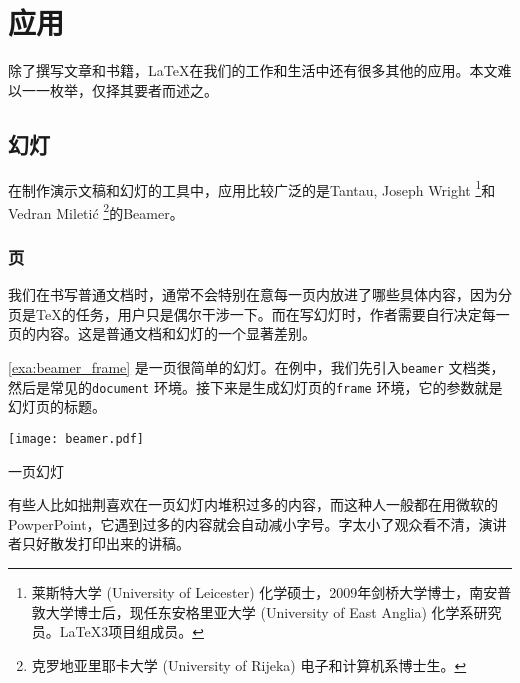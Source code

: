 \chapter{应用}

除了撰写文章和书籍，\LaTeX 在我们的工作和生活中还有很多其他的应用。本文难以一一枚举，仅择其要者而述之。

\section{幻灯}

在制作演示文稿和幻灯的工具中，应用比较广泛的是Tantau\indexTantau, Joseph Wright\indexWright{} \footnote{莱斯特大学 (University of Leicester) 化学硕士，2009年剑桥大学博士，南安普敦大学博士后，现任东安格里亚大学 (University of East Anglia) 化学系研究员。\LaTeX{}3项目组成员。}和Vedran Miletić\indexMiletic{} \footnote{克罗地亚里耶卡大学 (University of Rijeka) 电子和计算机系博士生。}的Beamer\citep{Tantau_2012}。

\subsection{页}

我们在书写普通文档时，通常不会特别在意每一页内放进了哪些具体内容，因为分页是\TeX 的任务，用户只是偶尔干涉一下。而在写幻灯时，作者需要自行决定每一页的内容。这是普通文档和幻灯的一个显著差别。

\autoref{exa:beamer_frame} 是一页很简单的幻灯。在例中，我们先引入\texttt{beamer} 文档类，然后是常见的\texttt{document} 环境。接下来是生成幻灯页的\texttt{frame} 环境，它的参数就是幻灯页的标题。


\begin{example}[h]
\begin{Demo}
\centering
\texttt{[image: beamer.pdf]}
\end{Demo}
\caption{一页幻灯}
\label{exa:beamer_frame}
\end{example}

有些人比如拙荆喜欢在一页幻灯内堆积过多的内容，而这种人一般都在用微软的PowperPoint，它遇到过多的内容就会自动减小字号。字太小了观众看不清，演讲者只好散发打印出来的讲稿。


